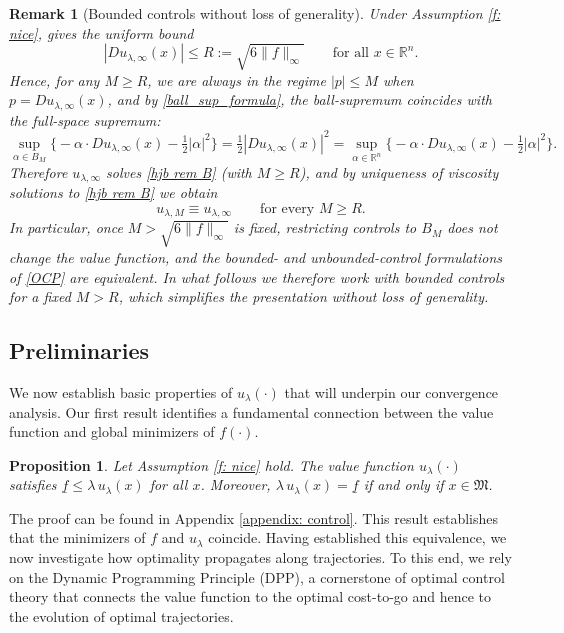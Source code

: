 \documentclass[12pt]{amsart}
\numberwithin{equation}{section}
\theoremstyle{plain}
\newtheorem{proposition}[theorem]{Proposition}
\newtheorem{remark}[theorem]{Remark}
\begin{document}
\begin{remark}[Bounded controls without loss of generality]
Under Assumption \ref{f: nice}, \cite[Lemma 2.1(iii)]{huang2025control} gives the uniform bound
\begin{equation*}
|Du_{\lambda,\infty}(x)|\le R:=\sqrt{6\|f\|_\infty}\qquad\text{for all }x\in\mathbb{R}^n.
\end{equation*}
Hence, for any $M\ge R$, we are always in the regime $|p|\le M$ when $p=Du_{\lambda,\infty}(x)$, and by \eqref{ball_sup_formula}, the ball-supremum coincides with the full-space supremum:
\begin{equation*}
\sup_{\alpha\in B_M}\Big\{-\alpha\cdot Du_{\lambda,\infty}(x)-\tfrac12|\alpha|^2\Big\}
=\tfrac12|Du_{\lambda,\infty}(x)|^2
=\sup_{\alpha\in\mathbb{R}^n}\Big\{-\alpha\cdot Du_{\lambda,\infty}(x)-\tfrac12|\alpha|^2\Big\}.
\end{equation*}
Therefore $u_{\lambda,\infty}$ solves \eqref{hjb rem B} (with $M\ge R$), and by uniqueness of viscosity solutions to \eqref{hjb rem B} we obtain
\begin{equation*}
u_{\lambda,M}\equiv u_{\lambda,\infty}\qquad\text{for every }M\ge R.
\end{equation*}
In particular, once $M>\sqrt{6\|f\|_\infty}$ is fixed, restricting controls to $B_M$ does not change the value function, and the bounded- and unbounded-control formulations of \eqref{OCP} are equivalent. In what follows we therefore work with bounded controls for a fixed $M>R$, which simplifies the presentation without loss of generality.
\end{remark}

\subsection{Preliminaries}
We now establish basic properties of $u_{\lambda}(\cdot)$ that will underpin our convergence analysis. Our first result identifies a fundamental connection between the value function and global minimizers of $f(\cdot)$.

\begin{proposition}
\label{prop: min_equality}
Let Assumption \ref{f: nice} hold. The value function $u_{\lambda}(\cdot)$ satisfies $\underline{f}\leq \lambda\, u_{\lambda}(x)$ for all $x$. Moreover, $\lambda\, u_{\lambda}(x) = \underline{f}$ if and only if $x\in \mathfrak{M}$.
\end{proposition}

The proof can be found in Appendix \ref{appendix: control}. This result establishes that the minimizers of 
$f$ and $u_{\lambda}$ coincide. 
Having established this equivalence, we now investigate how optimality propagates along trajectories. To this end, we rely on the Dynamic Programming Principle (DPP), a cornerstone of optimal control theory that connects the value function to the optimal cost-to-go and hence to the evolution of optimal trajectories.
\end{document}
